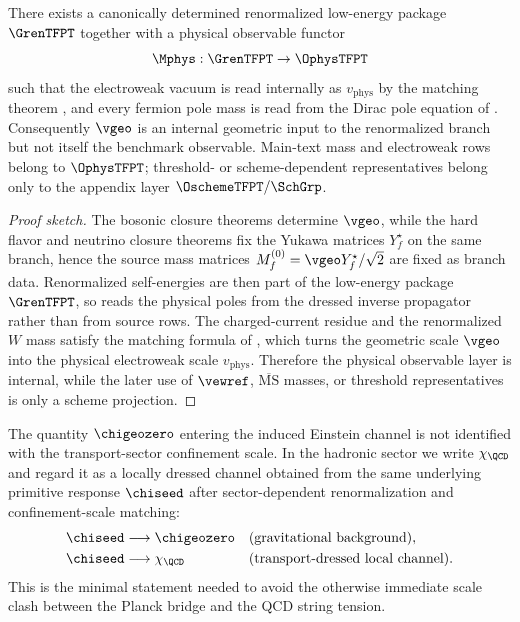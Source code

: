 \begin{theorem}
\label{thm:pole-level-readout}
There exists a canonically determined renormalized low-energy package $\GrenTFPT$ together with a
physical observable functor
\[
\Mphys:\GrenTFPT\to\OphysTFPT
\]
such that the electroweak vacuum is read internally as $v_{\mathrm{phys}}$ by the matching theorem
, and every fermion pole mass is read from the Dirac
pole equation of .
Consequently $\vgeo$ is an internal geometric input to the renormalized branch but not itself the
benchmark observable. Main-text mass and electroweak rows belong to $\OphysTFPT$; threshold- or
scheme-dependent representatives belong only to the appendix layer $\OschemeTFPT/\SchGrp$.
\end{theorem}

\begin{proof}[Proof sketch]
The bosonic closure theorems determine $\vgeo$, while the hard flavor and neutrino closure theorems
fix the Yukawa matrices $Y_f^\star$ on the same branch, hence the source mass matrices
$M_f^{(0)}=\vgeo Y_f^\star/\sqrt2$ are fixed as branch data. Renormalized self-energies are then
part of the low-energy package $\GrenTFPT$, so  reads the physical
poles from the dressed inverse propagator rather than from source rows. The charged-current residue
and the renormalized $W$ mass satisfy the matching formula of
, which turns the geometric scale $\vgeo$ into the
physical electroweak scale $v_{\mathrm{phys}}$. Therefore the physical observable layer is
internal, while the later use of $\vewref$, $\overline{\mathrm{MS}}$ masses, or threshold
representatives is only a scheme projection.
\end{proof}

\begin{remark}
The quantity $\chigeozero$ entering the induced Einstein channel is not identified with the transport-sector confinement scale. In the hadronic sector we write $\chi_{\QCD}$ and regard it as a locally dressed channel obtained from the same underlying primitive response $\chiseed$ after sector-dependent renormalization and confinement-scale matching:
\[
\begin{aligned}
\chiseed &\longrightarrow \chigeozero
&& \text{(gravitational background)},
\\
\chiseed &\longrightarrow \chi_{\QCD}
&& \text{(transport-dressed local channel)}.
\end{aligned}
\]
This is the minimal statement needed to avoid the otherwise immediate scale clash between the Planck bridge and the QCD string tension.
\end{remark}
